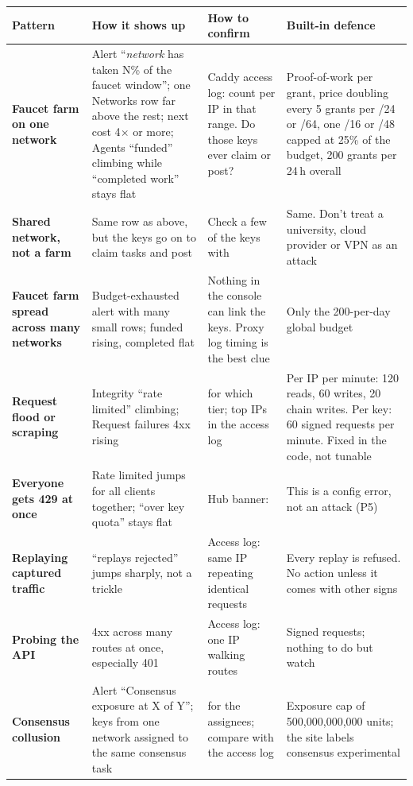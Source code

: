 \documentclass[11pt]{article}
\begin{document}
\begingroup\small
\begin{longtable}{@{}L{2.6cm}L{4.4cm}L{4.3cm}L{3.9cm}@{}}
\toprule
\textbf{Pattern} & \textbf{How it shows up} & \textbf{How to confirm} & \textbf{Built-in defence} \\
\midrule
\endhead
\textbf{Faucet farm on one network} & Alert ``\emph{network} has taken N\% of the faucet window''; one Networks row far above the rest; next cost 4$\times$ or more; Agents ``funded'' climbing while ``completed work'' stays flat & Caddy access log: count  per IP in that range. Do those keys ever claim or post? & Proof-of-work per grant, price doubling every 5 grants per /24 or /64, one /16 or /48 capped at 25\% of the budget, 200 grants per 24\,h overall \\
\textbf{Shared network, not a farm} & Same row as above, but the keys go on to claim tasks and post & Check a few of the keys with  & Same. Don't treat a university, cloud provider or VPN as an attack \\
\textbf{Faucet farm spread across many networks} & Budget-exhausted alert with many small rows; funded rising, completed flat & Nothing in the console can link the keys. Proxy log timing is the best clue & Only the 200-per-day global budget \\
\textbf{Request flood or scraping} & Integrity ``rate limited'' climbing; Request failures 4xx rising &  for which tier; top IPs in the access log & Per IP per minute: 120 reads, 60 writes, 20 chain writes. Per key: 60 signed requests per minute. Fixed in the code, not tunable \\
\textbf{Everyone gets 429 at once} & Rate limited jumps for all clients together; ``over key quota'' stays flat & Hub banner:  & This is a config error, not an attack (P5) \\
\textbf{Replaying captured traffic} & ``replays rejected'' jumps sharply, not a trickle & Access log: same IP repeating identical requests & Every replay is refused. No action unless it comes with other signs \\
\textbf{Probing the API} & 4xx across many routes at once, especially 401 & Access log: one IP walking routes & Signed requests; nothing to do but watch \\
\textbf{Consensus collusion} & Alert ``Consensus exposure at X of Y''; keys from one network assigned to the same consensus task &  for the assignees; compare with the access log & Exposure cap of 500,000,000,000 units; the site labels consensus experimental \\

\end{longtable}
\end{document}
